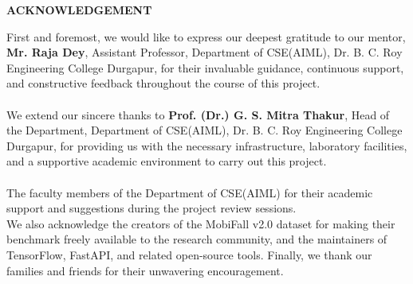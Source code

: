 \thispagestyle{plain}
\begin{center}
\textbf{ACKNOWLEDGEMENT}
\end{center}

\vspace{0.3cm}
\noindent
\fontsize{12pt}{24pt}\selectfont
First and foremost, we would like to express our deepest gratitude to our mentor, \textbf{Mr. Raja Dey}, Assistant Professor, Department of CSE(AIML), Dr. B. C. Roy Engineering College Durgapur, for their invaluable guidance, continuous support, and constructive feedback throughout the course of this project.\\\\

We extend our sincere thanks to \textbf{Prof. (Dr.) G. S. Mitra Thakur}, Head of the Department, Department of CSE(AIML), Dr. B. C. Roy Engineering College Durgapur, for providing us with the necessary infrastructure, laboratory facilities, and a supportive academic environment to carry out this project.\\\\

\vspace{1.0cm}
\noindent
\fontsize{12pt}{24pt}\selectfont
The faculty members of the Department of CSE(AIML) for their academic support and suggestions during the project review sessions.\\

\vspace{1.0cm}
\noindent
\fontsize{12pt}{24pt}\selectfont
We also acknowledge the creators of the MobiFall v2.0 dataset for making their benchmark freely available to the research community, and the maintainers of TensorFlow, FastAPI, and related open-source tools. Finally, we thank our families and friends for their unwavering encouragement.\\

\newpage